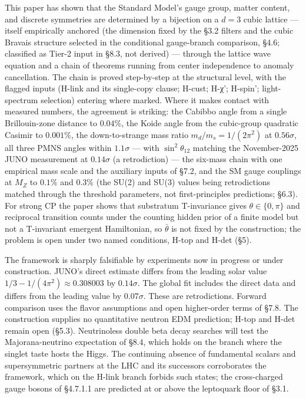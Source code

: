 \documentclass[
]{article}
\begin{document}
This paper has shown that the Standard Model's gauge group, matter
content, and discrete symmetries are determined by a bijection on a
\(d = 3\) cubic lattice --- itself empirically anchored (the dimension
fixed by the §3.2 filters and the cubic Bravais structure selected in
the conditional gauge-branch comparison, §4.6; classified as Tier-2
input in §8.3, not derived) --- through the lattice wave equation and a
chain of theorems running from center independence to anomaly
cancellation. The chain is proved step-by-step at the structural level,
with the flagged inputs (H-link and its single-copy clause; H-cust;
H-χ'; H-spin'; light-spectrum selection) entering where marked. Where it
makes contact with measured numbers, the agreement is striking: the
Cabibbo angle from a single Brillouin-zone distance to \(0.04\%\), the
Koide angle from the cubic-group quadratic Casimir to \(0.001\%\), the
down-to-strange mass ratio \(m_d/m_s = 1/(2\pi^2)\) at \(0.56\sigma\),
all three PMNS angles within \(1.1\sigma\) --- with
\(\sin^2\theta_{12}\) matching the November-2025 JUNO measurement at
\(0.14\sigma\) (a retrodiction) --- the six-mass chain with one
empirical mass scale and the auxiliary inputs of §7.2, and the SM gauge
couplings at \(M_Z\) to \(0.1\%\) and \(0.3\%\) (the SU(2) and SU(3)
values being retrodictions matched through the threshold parameters, not
first-principles predictions; §6.3). For strong CP the paper shows that
substratum T-invariance gives \(\theta\in\{0,\pi\}\) and reciprocal
transition counts under the counting hidden prior of a finite model but
not a T-invariant emergent Hamiltonian, so \(\bar\theta\) is not fixed
by the construction; the problem is open under two named conditions,
H-top and H-det (§5).

The framework is sharply falsifiable by experiments now in progress or
under construction. JUNO's direct estimate differs from the leading
solar value \(1/3-1/(4\pi^2)\approx0.308003\) by \(0.14\sigma\). The
global fit includes the direct data and differs from the leading value
by \(0.07\sigma\). These are retrodictions. Forward comparison uses the
flavor assumptions and open higher-order terms of §7.8. The construction
supplies no quantitative neutron EDM prediction; H-top and H-det remain
open (§5.3). Neutrinoless double beta decay searches will test the
Majorana-neutrino expectation of §8.4, which holds on the branch where
the singlet taste hosts the Higgs. The continuing absence of fundamental
scalars and supersymmetric partners at the LHC and its successors
corroborates the framework, which on the H-link branch forbids such
states; the cross-charged gauge bosons of §4.7.1.1 are predicted at or
above the leptoquark floor of §3.1.
\end{document}
